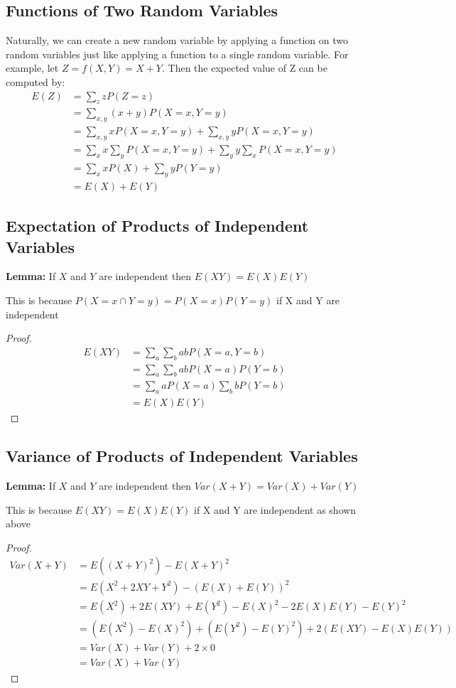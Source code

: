 \documentclass[11pt]{article}
\begin{document}
\subsection{Functions of Two Random Variables}
Naturally, we can create a new random variable by applying a function on two random variables just like applying a function to a single random variable.
For example, let $Z = f(X, Y) = X + Y$. Then the expected value of Z can be computed by:
\begin{align*}
  E(Z)   &= \sum_{z} zP(Z=z) 
      \\ &= \sum_{x,y}(x+y)P(X=x, Y=y) 
      \\ &= \sum_{x,y}xP(X=x, Y=y) + \sum_{x,y}yP(X=x, Y=y) 
      \\ &= \sum_{x}x \sum_{y} P(X=x, Y=y) + \sum_{y}y \sum_{x} P(X=x, Y=y) 
      \\ &= \sum_{x}xP(X) + \sum_{y}yP(Y=y)
      \\ &= E(X) + E(Y) 
\end{align*}

\subsection{Expectation of Products of Independent Variables}
\textbf{Lemma:} If $X$ and $Y$ are independent then $E(XY) = E(X)E(Y)$

This is because $P(X=x \cap Y=y) = P(X=x)P(Y=y)$ if X and Y are independent
\begin{proof}
  \begin{align*}
    E(XY) &= \sum_{a}\sum_{b}ab P(X=a, Y=b)
    \\ &= \sum_{a}\sum_{b}ab P(X=a) P(Y=b)
    \\ &= \sum_{a} a P(X=a) \sum_{b}b P(Y=b)
    \\ &= E(X)E(Y)
  \end{align*}
\end{proof}

\subsection{Variance of Products of Independent Variables}
\textbf{Lemma:} If $X$ and $Y$ are independent then $Var(X + Y) = Var(X) + Var(Y)$

This is because $E(XY) = E(X)E(Y)$ if X and Y are independent as shown above
\begin{proof}
  \begin{align*}
    Var(X+Y) &= E((X+Y)^2) - E(X+Y)^2
    \\ &= E(X^2 + 2XY + Y^2) - (E(X) + E(Y))^2 
    \\ &= E(X^2) + 2E(XY) + E(Y^2) - E(X)^2 - 2E(X)E(Y) - E(Y)^2 
    \\ &= (E(X^2) - E(X)^2) + (E(Y^2) - E(Y)^2) + 2(E(XY) - E(X)E(Y))
    \\ &= Var(X) + Var(Y) + 2 \times 0
    \\ &= Var(X) + Var(Y)
  \end{align*}
\end{proof}
\end{document}
